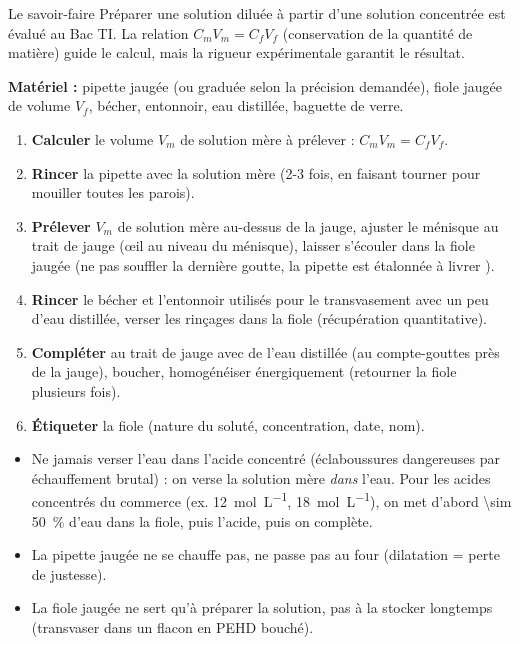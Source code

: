 \documentclass[11pt]{article}
\begin{document}
Le savoir-faire \og Préparer une solution diluée à partir d'une solution concentrée \fg{} est évalué au Bac TI. La relation $C_m V_m = C_f V_f$ (conservation de la quantité de matière) guide le calcul, mais la rigueur expérimentale garantit le résultat.

\begin{methode}
\textbf{Matériel :} pipette jaugée (ou graduée selon la précision demandée), fiole jaugée de volume $V_f$, bécher, entonnoir, eau distillée, baguette de verre.
\begin{enumerate}
\item \textbf{Calculer} le volume $V_m$ de solution mère à prélever : $C_m V_m = C_f V_f$.
\item \textbf{Rincer} la pipette avec la solution mère (2-3 fois, en faisant tourner pour mouiller toutes les parois).
\item \textbf{Prélever} $V_m$ de solution mère au-dessus de la jauge, ajuster le ménisque au trait de jauge (œil au niveau du ménisque), laisser s'écouler dans la fiole jaugée (ne pas souffler la dernière goutte, la pipette est étalonnée \og à livrer \fg{}).
\item \textbf{Rincer} le bécher et l'entonnoir utilisés pour le transvasement avec un peu d'eau distillée, verser les rinçages dans la fiole (récupération quantitative).
\item \textbf{Compléter} au trait de jauge avec de l'eau distillée (au compte-gouttes près de la jauge), boucher, homogénéiser énergiquement (retourner la fiole plusieurs fois).
\item \textbf{Étiqueter} la fiole (nature du soluté, concentration, date, nom).
\end{enumerate}
\end{methode}

\begin{attention}
\begin{itemize}
\item Ne jamais verser l'eau dans l'acide concentré (éclaboussures dangereuses par échauffement brutal) : on verse la solution mère \emph{dans} l'eau. Pour les acides concentrés du commerce (ex.  \SI{12}{mol.L^{-1}},  \SI{18}{mol.L^{-1}}), on met d'abord \SI{\sim 50}{\%} d'eau dans la fiole, puis l'acide, puis on complète.
\item La pipette jaugée ne se chauffe pas, ne passe pas au four (dilatation = perte de justesse).
\item La fiole jaugée ne sert qu'à préparer la solution, pas à la stocker longtemps (transvaser dans un flacon en PEHD bouché).
\end{itemize}
\end{attention}
\end{document}
